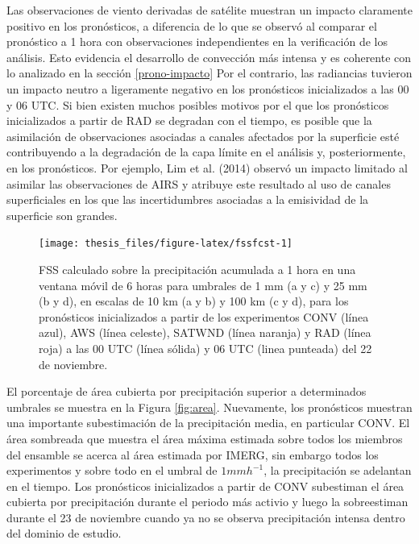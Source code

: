 \documentclass[12pt,oneside]{reedthesis}
\begin{document}
Las observaciones de viento derivadas de satélite muestran un impacto claramente positivo en los pronósticos, a diferencia de lo que se observó al comparar el pronóstico a 1 hora con observaciones independientes en la verificación de los análisis. Esto evidencia el desarrollo de convección más intensa y es coherente con lo analizado en la sección \ref{prono-impacto} Por el contrario, las radiancias tuvieron un impacto neutro a ligeramente negativo en los pronósticos inicializados a las 00 y 06 UTC. Si bien existen muchos posibles motivos por el que los pronósticos inicializados a partir de RAD se degradan con el tiempo, es posible que la asimilación de observaciones asociadas a canales afectados por la superficie esté contribuyendo a la degradación de la capa límite en el análisis y, posteriormente, en los pronósticos. Por ejemplo, Lim et al. (2014) observó un impacto limitado al asimilar las observaciones de AIRS y atribuye este resultado al uso de canales superficiales en los que las incertidumbres asociadas a la emisividad de la superficie son grandes.


\begin{figure}
\texttt{[image: thesis\_files/figure-latex/fssfcst-1]} \caption{FSS calculado sobre la precipitación acumulada a 1 hora en una ventana móvil de 6 horas para umbrales de 1 mm (a y c) y 25 mm (b y d), en escalas de 10 km (a y b) y 100 km (c y d), para los pronósticos inicializados a partir de los experimentos CONV (línea azul), AWS (línea celeste), SATWND (línea naranja) y RAD (línea roja) a las 00 UTC (línea sólida) y 06 UTC (linea punteada) del 22 de noviembre.}\label{fig:fssfcst}
\end{figure}
El porcentaje de área cubierta por precipitación superior a determinados umbrales se muestra en la Figura \ref{fig:area}. Nuevamente, los pronósticos muestran una importante subestimación de la precipitación media, en particular CONV. El área sombreada que muestra el área máxima estimada sobre todos los miembros del ensamble se acerca al área estimada por IMERG, sin embargo todos los experimentos y sobre todo en el umbral de \(1 mmh^{-1}\), la precipitación se adelantan en el tiempo. Los pronósticos inicializados a partir de CONV subestiman el área cubierta por precipitación durante el periodo más activio y luego la sobreestiman durante el 23 de noviembre cuando ya no se observa precipitación intensa dentro del dominio de estudio.
\end{document}
